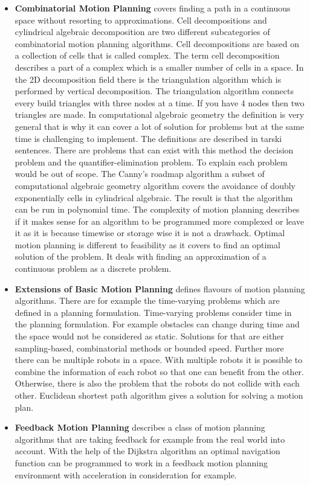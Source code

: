\begin{itemize}
    \item \textbf{Combinatorial Motion Planning} covers finding a path in a continuous space without resorting to approximations. Cell decompositions and cylindrical algebraic decomposition are two different subcategories of combinatorial motion planning algorithms. Cell decompositions are based on a collection of cells that is called complex. The term cell decomposition describes a part of a complex which is a smaller number of cells in a space. In the 2D decomposition field there is the triangulation algorithm which is performed by vertical decomposition. The triangulation algorithm connects every build triangles with three nodes at a time. If you have 4 nodes then two triangles are made. In computational algebraic geometry the definition is very general that is why it can cover a lot of solution for problems but at the same time is challenging to implement. The definitions are described in tarski sentences. There are problems that can exist with this method the decision problem and the quantifier-elimination problem. To explain each problem would be out of scope. The Canny's roadmap algorithm a subset of computational algebraic geometry algorithm covers the avoidance of doubly exponentially cells in cylindrical algebraic. The result is that the algorithm can be run in polynomial time. The complexity of motion planning describes if it makes sense for an algorithm to be programmed more complexed or leave it as it is because timewise or storage wise it is not a drawback. Optimal motion planning is different to feasibility as it covers to find an optimal solution of the problem. It deals with finding an approximation of a continuous problem as a discrete problem.
    \item \textbf{Extensions of Basic Motion Planning} defines flavours of motion planning algorithms. There are for example the time-varying problems which are defined in a planning formulation. Time-varying problems consider time in the planning formulation. For example obstacles can change during time and the space would not be considered as static. Solutions for that are either sampling-based, combinatorial methods or bounded speed. Further more there can be multiple robots in a space. With multiple robots it is possible to combine the information of each robot so that one can benefit from the other. Otherwise, there is also the problem that the robots do not collide with each other. Euclidean shortest path algorithm gives a solution for solving a motion plan.
    \item \textbf{Feedback Motion Planning} describes a class of motion planning algorithms that are taking feedback for example from the real world into account. With the help of the Dijkstra algorithm an optimal navigation function can be programmed to work in a feedback motion planning environment with acceleration in consideration for example.
\end{itemize}

